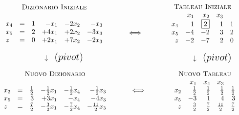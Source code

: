 \documentclass{article}
\begin{document}
  	\[
  	\begin{array}{c}
  	\mbox{\sc Dizionario Iniziale}\\ \\
  	\begin{array}{lcrrrr}
  	x_{4} &=& 1 & -x_1 & -2x_2 & -x_3 \\
  	x_{5} &=& 2 & +4x_1 & +2x_2 & -3x_3 \\
  	z    &=& 0 & +2x_1 & +7x_2 & -2x_3 \\
  	\end{array}\\ \\
  	\hspace{1cm} {\Huge \downarrow} {\Large \mbox{ \ $(pivot)$}}
  	\end{array}
  	\hfill
  	\hspace{1cm}
  	{\Huge \Longleftrightarrow}
  	\hfill
  	\hspace{1.2cm}
  	\begin{array}{c}
  	\mbox{\sc Tableau Iniziale}\\ 
  	\begin{array}{rrrrr}
  	& x_1  & x_2 & x_3  \\
  	x_4 &  1 &  \fbox{2} &  1   &  1 \\
  	x_5 & -4 & -2 & 3 &  2 \\
  	z  & -2 & -7 &  2   &  0 \\
  	\end{array}\\ \\
  	\hspace{1cm} {\Huge \downarrow} {\Large \mbox{ \ $(pivot)$}}
  	\end{array}
  	\]
  	
  	\[
  	\begin{array}{c}
  	\mbox{\sc Nuovo Dizionario}\\ \\
			\begin{array}{lcrrrr}
			x_{2} &=& \frac{1}{2} & -\frac{1}{2}x_1 & -\frac{1}{2}x_4 & -\frac{1}{2}x_3 \\
			x_{5} &=& 3 & +3x_1 & -x_4 & -4x_3 \\
			z    &=& \frac{7}{2} & -\frac{3}{2}x_1 & -\frac{7}{2}x_4 & -\frac{11}{2}x_3 \\
			\end{array}		
  	\end{array}
  	\hfill
  	\hspace{1cm}
  	{\Huge \Longleftrightarrow}
  	\hfill
  	\hspace{1.2cm}
  	\begin{array}{c}
  	\mbox{\sc Nuovo Tableau}\\ 
  	\begin{array}{rrrrr}
  	& x_1  & x_4 & x_3  \\
  	x_2 &  \frac{1}{2} &  \frac{1}{2} & \frac{1}{2}   &  \frac{1}{2} \\
  	x_5 & -3 &  1  &  4  &  3 \\
  	z  &  \frac{3}{2} &  \frac{7}{2} & \frac{11}{2}  & \frac{7}{2} \\
  	\end{array}
  	\end{array}
  	\]
  	
\end{document}
